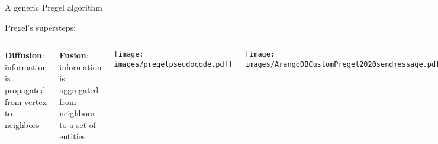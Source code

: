 \documentclass[aspectratio = 169, 15pt]{beamer}
\begin{document}
    \begin{frame}{A generic Pregel algorithm}
        
        \hspace*{-0.7cm}
        {\color{darkgray}Pregel's supersteps:}
        \begin{columns}[t]
                \vspace*{-0.3cm}
                
                \hspace*{-0.1cm}
                \small \textbf{Diffusion}: information is propagated from vertex to neighbors
                
                \hspace*{-0.1cm}
                \small \textbf{Fusion}: information is aggregated from neighbors to a set of entities
                
                \vspace*{-1cm}
                \hspace*{-2cm}
                \begin{center}
                    \texttt{[image: images/pregelpseudocode.pdf]}
                \end{center}
                
                \vspace*{-0.1cm}
                \begin{center}
                    \hspace*{-4.7cm}
                    \texttt{[image: images/ArangoDBCustomPregel2020sendmessage.pdf]}
                \end{center}
        \end{columns}
    \end{frame}
    
\end{document}
